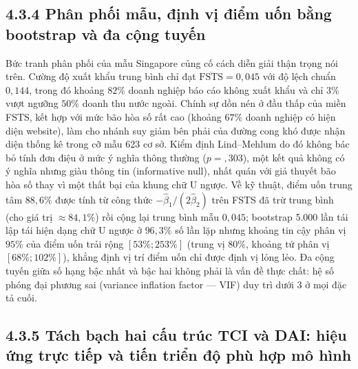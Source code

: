 \documentclass[
  a4paper,
  13pt]{extreport}
\begin{document}
\hypertarget{phuxe2n-phux1ed1i-mux1eabu-ux111ux1ecbnh-vux1ecb-ux111iux1ec3m-uux1ed1n-bux1eb1ng-bootstrap-vuxe0-ux111a-cux1ed9ng-tuyux1ebfn}{%
\subsection{4.3.4 Phân phối mẫu, định vị điểm uốn bằng bootstrap và đa
cộng
tuyến}\label{phuxe2n-phux1ed1i-mux1eabu-ux111ux1ecbnh-vux1ecb-ux111iux1ec3m-uux1ed1n-bux1eb1ng-bootstrap-vuxe0-ux111a-cux1ed9ng-tuyux1ebfn}}

Bức tranh phân phối của mẫu Singapore củng cố cách diễn giải thận trọng
nói trên. Cường độ xuất khẩu trung bình chỉ đạt
\(\overline{\text{FSTS}} = 0{,}045\) với độ lệch chuẩn \(0{,}144\),
trong đó khoảng \(82\%\) doanh nghiệp báo cáo không xuất khẩu và chỉ
\(3\%\) vượt ngưỡng \(50\%\) doanh thu nước ngoài. Chính sự dồn nén ở
đầu thấp của miền FSTS, kết hợp với mức bão hòa số rất cao (khoảng
\(67\%\) doanh nghiệp có hiện diện website), làm cho nhánh suy giảm bên
phải của đường cong khó được nhận diện thống kê trong cỡ mẫu 623 cơ sở.
Kiểm định Lind--Mehlum do đó không bác bỏ tính đơn điệu ở mức ý nghĩa
thông thường (\(p = {,}303\)), một kết quả không có ý nghĩa nhưng giàu
thông tin (informative null), nhất quán với giả thuyết bão hòa số thay
vì một thất bại của khung chữ U ngược. Về kỹ thuật, điểm uốn trung tâm
\(88{,}6\%\) được tính từ công thức \(-\hat{\beta}_1/(2\hat{\beta}_2)\)
trên FSTS đã trừ trung bình (cho giá trị \(\approx 84{,}1\%\)) rồi cộng
lại trung bình mẫu \(0{,}045\); bootstrap 5.000 lần tái lập tái hiện
dạng chữ U ngược ở \(96{,}3\%\) số lần lặp nhưng khoảng tin cậy phân vị
\(95\%\) của điểm uốn trải rộng \([53\%; 253\%]\) (trung vị \(80\%\),
khoảng tứ phân vị \([68\%; 102\%]\)), khẳng định vị trí điểm uốn chỉ
được định vị lỏng lẻo. Đa cộng tuyến giữa số hạng bậc nhất và bậc hai
không phải là vấn đề thực chất: hệ số phóng đại phương sai (variance
inflation factor --- VIF) duy trì dưới 3 ở mọi đặc tả cuối.

\hypertarget{tuxe1ch-bux1ea1ch-hai-cux1ea5u-truxfac-tci-vuxe0-dai-hiux1ec7u-ux1ee9ng-trux1ef1c-tiux1ebfp-vuxe0-tiux1ebfn-triux1ec3n-ux111ux1ed9-phuxf9-hux1ee3p-muxf4-huxecnh}{%
\subsection{4.3.5 Tách bạch hai cấu trúc TCI và DAI: hiệu ứng trực tiếp
và tiến triển độ phù hợp mô
hình}\label{tuxe1ch-bux1ea1ch-hai-cux1ea5u-truxfac-tci-vuxe0-dai-hiux1ec7u-ux1ee9ng-trux1ef1c-tiux1ebfp-vuxe0-tiux1ebfn-triux1ec3n-ux111ux1ed9-phuxf9-hux1ee3p-muxf4-huxecnh}}
\end{document}
